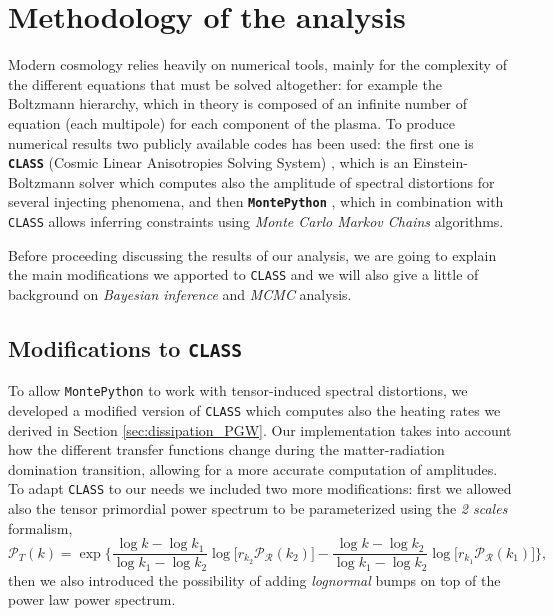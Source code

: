 \section{Methodology of the analysis}
Modern cosmology relies heavily on numerical tools, mainly for the complexity of the different equations that must be solved altogether: for example the Boltzmann hierarchy, which in theory is composed of an infinite number of equation (each multipole) for each component of the plasma.
To produce numerical results two publicly available codes has been used: the first one is \textbf{\texttt{CLASS}} (Cosmic Linear Anisotropies Solving System) \cite{CLASS}, which is an Einstein-Boltzmann solver which computes also the amplitude of spectral distortions for several injecting phenomena, and then \textbf{\texttt{MontePython}} \cite{Brinckmann:2018cvx,Audren:2012wb}, which in combination with \texttt{CLASS} allows inferring constraints using \emph{Monte Carlo Markov Chains} algorithms.

Before proceeding discussing the results of our analysis, we are going to explain the main modifications we apported to \texttt{CLASS} and we will also give a little of background on \textit{Bayesian inference} and \textit{MCMC} analysis.
\subsection{Modifications to \texttt{CLASS}}
To allow \texttt{MontePython} to work with tensor-induced spectral distortions, we developed a modified version of \texttt{CLASS} which computes also the heating rates we derived in Section \ref{sec:dissipation_PGW}. Our implementation takes into account how the different transfer functions change during the matter-radiation domination transition, allowing for a more accurate computation of amplitudes.\\
To adapt \texttt{CLASS} to our needs we included two more modifications: first we allowed also the tensor primordial power spectrum to be parameterized using the \emph{2 scales} formalism, 
$$\mathcal P_T(k)=\exp\bigg\{\frac{\log k-\log k_1}{\log k_1 -\log k_2}\log \Big[r_{k_2}\mathcal{P_R}(k_2)\Big]-\frac{\log k-\log k_2}{\log k_1 -\log k_2}\log \Big[r_{k_1}\mathcal{ P_{R}}(k_1)\Big]\bigg\},$$
 then we also introduced the possibility of adding \emph{lognormal} bumps on top of the power law power spectrum.
